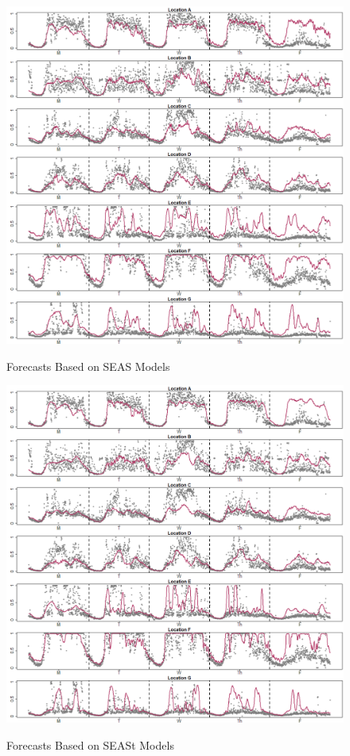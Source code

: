 \begin{figure}[htbp]
\caption{Forecasts Based on SEAS Models}
\includegraphics[width=\textwidth]{SEASESTPlots}
\label{fig:SEASESTPlots}
\end{figure}

\begin{figure}[htbp]
\caption{Forecasts Based on SEASt Models}
\includegraphics[width=\textwidth]{SEASESTtPlots}
\label{fig:SEASESTtPlots}
\end{figure}

